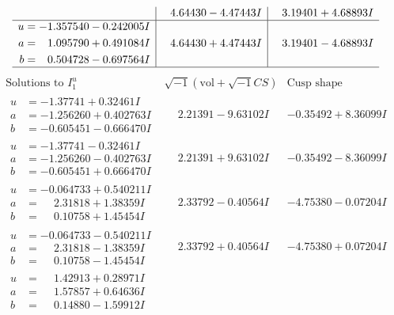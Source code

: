 \documentclass[1p]{elsarticle_modified}
\theoremstyle{definition}
\newcommand{\I}{\sqrt{-1}}
\begin{document}
$$\begin{array}{c|c|c}
 & \phantom{-}4.64430 - 4.47443 I & \phantom{-}3.19401 + 4.68893 I \\ \hline\begin{aligned}
u &= -1.357540 - 0.242005 I \\
a &= \phantom{-}1.095790 + 0.491084 I \\
b &= \phantom{-}0.504728 - 0.697564 I\end{aligned}
 & \phantom{-}4.64430 + 4.47443 I & \phantom{-}3.19401 - 4.68893 I\\
 \hline 
 \end{array}$$\newpage$$\begin{array}{c|c|c}  
\text{Solutions to }I^u_{1}& \I (\text{vol} + \sqrt{-1}CS) & \text{Cusp shape}\\
 \hline 
\begin{aligned}
u &= -1.37741 + 0.32461 I \\
a &= -1.256260 + 0.402763 I \\
b &= -0.605451 - 0.666470 I\end{aligned}
 & \phantom{-}2.21391 - 9.63102 I & -0.35492 + 8.36099 I \\ \hline\begin{aligned}
u &= -1.37741 - 0.32461 I \\
a &= -1.256260 - 0.402763 I \\
b &= -0.605451 + 0.666470 I\end{aligned}
 & \phantom{-}2.21391 + 9.63102 I & -0.35492 - 8.36099 I \\ \hline\begin{aligned}
u &= -0.064733 + 0.540211 I \\
a &= \phantom{-}2.31818 + 1.38359 I \\
b &= \phantom{-}0.10758 + 1.45454 I\end{aligned}
 & \phantom{-}2.33792 - 0.40564 I & -4.75380 - 0.07204 I \\ \hline\begin{aligned}
u &= -0.064733 - 0.540211 I \\
a &= \phantom{-}2.31818 - 1.38359 I \\
b &= \phantom{-}0.10758 - 1.45454 I\end{aligned}
 & \phantom{-}2.33792 + 0.40564 I & -4.75380 + 0.07204 I \\ \hline\begin{aligned}
u &= \phantom{-}1.42913 + 0.28971 I \\
a &= \phantom{-}1.57857 + 0.64636 I \\
b &= \phantom{-}0.14880 - 1.59912 I\end{aligned}

\end{array}$$
\end{document}
